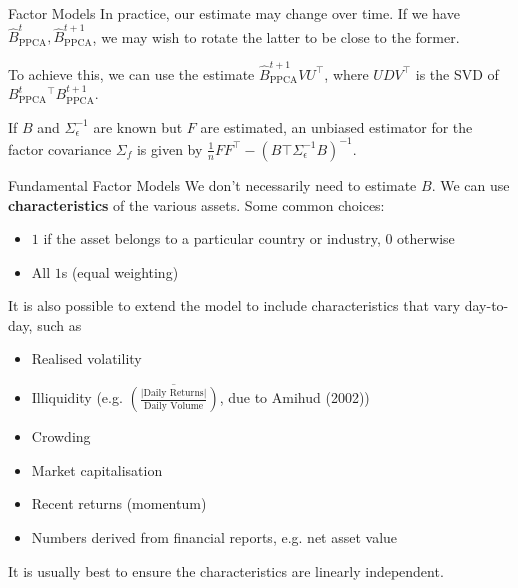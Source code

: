 \documentclass{beamer}
\begin{document}
\begin{frame}{Factor Models}
	In practice, our estimate may change over time. If we have $\hat{B}_\textrm{PPCA}^t,\hat{B}_\textrm{PPCA}^{t+1}$, we may wish to rotate the latter to be close to the former.

	To achieve this, we can use the estimate $\hat{B}_\textrm{PPCA}^{t+1}VU^\top$, where $UDV^\top$ is the SVD of $B_\textrm{PPCA}^t^\top B_\textrm{PPCA}^{t+1}$.%

	If $B$ and $\Sigma_\epsilon^{-1}$ are known but $F$ are estimated, an unbiased estimator for the factor covariance $\Sigma_f$ is given by $\frac{1}{n}F F^\top - (B\top \Sigma_\epsilon^{-1} B)^{-1}$.%
\end{frame}

\begin{frame}{Fundamental Factor Models}
	We don't necessarily need to estimate $B$. We can use \textbf{characteristics} of the various assets. Some common choices:
	\begin{itemize}
		\item $1$ if the asset belongs to a particular country or industry, $0$ otherwise
		\item All $1$s (equal weighting)
	\end{itemize}

	It is also possible to extend the model to include characteristics that vary day-to-day, such as
	\begin{itemize}
		\item Realised volatility
		\item Illiquidity (e.g. $\overline{\left(\frac{\vert \textrm{Daily Returns}\vert}{\textrm{Daily Volume}}\right)}$, due to Amihud (2002))
		\item Crowding
		\item Market capitalisation
		\item Recent returns (momentum)%
		\item Numbers derived from financial reports, e.g. net asset value
	\end{itemize}

	It is usually best to ensure the characteristics are linearly independent.
\end{frame}
\end{document}
